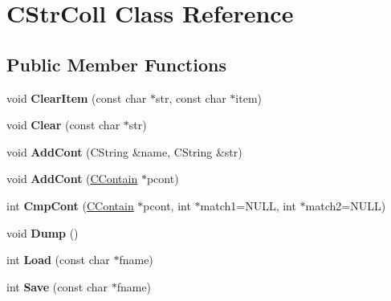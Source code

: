 \hypertarget{class_c_str_coll}{\section{C\-Str\-Coll Class Reference}
\label{class_c_str_coll}
}
\subsection*{Public Member Functions}
\begin{DoxyCompactItemize}
\item 
\hypertarget{class_c_str_coll_aa12a985bf0b599682044160bad419785}{void {\bfseries Clear\-Item} (const char $\ast$str, const char $\ast$item)}\label{class_c_str_coll_aa12a985bf0b599682044160bad419785}

\item 
\hypertarget{class_c_str_coll_a7b358fcc5ead1f0d4d8fee03fa8529ed}{void {\bfseries Clear} (const char $\ast$str)}\label{class_c_str_coll_a7b358fcc5ead1f0d4d8fee03fa8529ed}

\item 
\hypertarget{class_c_str_coll_af0e4a57fcb4b1e6dc9a92fb2d495165e}{void {\bfseries Add\-Cont} (C\-String \&name, C\-String \&str)}\label{class_c_str_coll_af0e4a57fcb4b1e6dc9a92fb2d495165e}

\item 
\hypertarget{class_c_str_coll_ad418064bfe294952eb22bd3d6b25ee8c}{void {\bfseries Add\-Cont} (\hyperlink{class_c_contain}{C\-Contain} $\ast$pcont)}\label{class_c_str_coll_ad418064bfe294952eb22bd3d6b25ee8c}

\item 
\hypertarget{class_c_str_coll_af50c708c3b2ca0e264e21521269fae7f}{int {\bfseries Cmp\-Cont} (\hyperlink{class_c_contain}{C\-Contain} $\ast$pcont, int $\ast$match1=N\-U\-L\-L, int $\ast$match2=N\-U\-L\-L)}\label{class_c_str_coll_af50c708c3b2ca0e264e21521269fae7f}

\item 
\hypertarget{class_c_str_coll_af54758f0456f54ddbb1488388d150042}{void {\bfseries Dump} ()}\label{class_c_str_coll_af54758f0456f54ddbb1488388d150042}

\item 
\hypertarget{class_c_str_coll_ae1c7fc0487e5a214f152888cbf9f29b2}{int {\bfseries Load} (const char $\ast$fname)}\label{class_c_str_coll_ae1c7fc0487e5a214f152888cbf9f29b2}

\item 
\hypertarget{class_c_str_coll_ac76e3929192318d2a1f31505e1d818b9}{int {\bfseries Save} (const char $\ast$fname)}\label{class_c_str_coll_ac76e3929192318d2a1f31505e1d818b9}


\end{DoxyCompactItemize}
